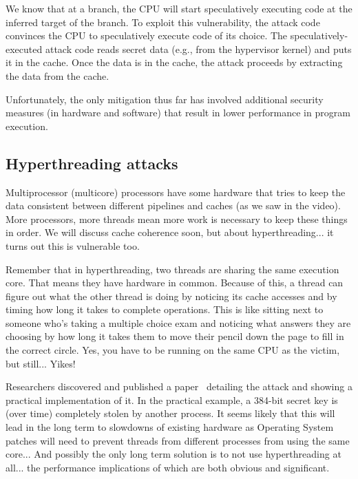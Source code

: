 We know that at a branch, the CPU will start speculatively executing code at the inferred target of the branch. To exploit this vulnerability, the attack code convinces the CPU to speculatively execute code of its choice. The speculatively-executed attack code reads secret data (e.g., from the hypervisor kernel) and puts it in the cache. Once the data is in the cache, the attack proceeds by extracting the data from the cache.

Unfortunately, the only mitigation thus far has involved additional security measures (in hardware and software) that result in lower performance in program execution.

\subsection*{Hyperthreading attacks}
Multiprocessor (multicore) processors have some hardware that tries to keep the data consistent between different pipelines and caches (as we saw in the video). More processors, more threads mean more work is necessary to keep these things in order. We will discuss cache coherence soon, but about hyperthreading... it turns out this is vulnerable too.

Remember that in hyperthreading, two threads are sharing the same execution core. That means they have hardware in common. Because of this, a thread can figure out what the other thread is doing by noticing its cache accesses and by timing how long it takes to complete operations. This is like sitting next to someone who's taking a multiple choice exam and noticing what answers they are choosing by how long it takes them to move their pencil down the page to fill in the correct circle. Yes, you have to be running on the same CPU as the victim, but still... Yikes! 

Researchers discovered and published a paper~\cite{portsmash} detailing the attack and showing a practical implementation of it. In the practical example, a 384-bit secret key is (over time) completely stolen by another process. It seems likely that this will lead in the long term to slowdowns of existing hardware as Operating System patches will need to prevent threads from different processes from using the same core... And possibly the only long term solution is to not use hyperthreading at all... the performance implications of which are both obvious and significant.





